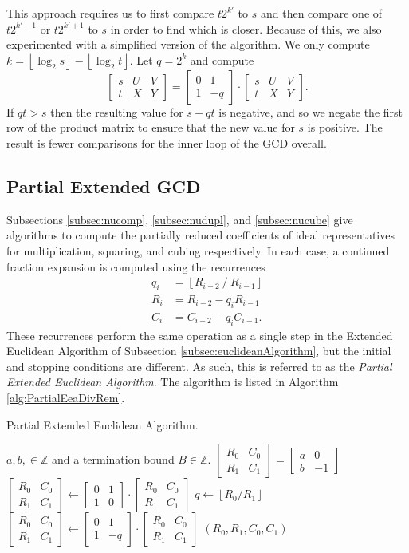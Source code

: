 \documentclass{ucalgthes1}
\theoremstyle{definition}
\newcommand{\ZZ}{\mathbb{Z}}
\newcommand{\matrixtt}[4]{\left[ \begin{array}{rr} #1 & #2 \\ #3 & #4 \end{array} \right]}
\newcommand{\matrixThreeTwo}[6]{\left[ \begin{array}{rrr} #1 & #2 & #3 \\ #4 & #5 & #6 \end{array} \right]}
\newcommand{\floor}[1]{\left\lfloor #1 \right\rfloor}
\begin{document}
This approach requires us to first compare $t2^{k'}$ to $s$ and then compare one of $t2^{k'-1}$ or $t2^{k'+1}$ to $s$ in order to find which is closer.  Because of this, we also experimented with a simplified version of the algorithm.  We only compute $k = \floor{\log_2s}-\floor{\log_2t}$.  Let $q=2^k$ and compute
\[
	\matrixThreeTwo{s}{U}{V}{t}{X}{Y} =
		\matrixtt{0}{1}{1}{-q} \cdot \matrixThreeTwo{s}{U}{V}{t}{X}{Y}.
\]
If $qt > s$ then the resulting value for $s-qt$ is negative, and so we negate the first row of the product matrix to ensure that the new value for $s$ is positive.  The result is fewer comparisons for the inner loop of the GCD overall.



\subsection{Partial Extended GCD}

Subsections \ref{subsec:nucomp}, \ref{subsec:nudupl}, and \ref{subsec:nucube} give algorithms to compute the partially reduced coefficients of ideal representatives for multiplication, squaring, and cubing respectively.  In each case, a continued fraction expansion is computed using the recurrences
\begin{align*}
	q_i &= \floor{R_{i-2} ~/~ R_{i-1}} \\
	R_i &= R_{i-2} - q_i R_{i-1} \\
	C_i &= C_{i-2} - q_i C_{i-1}.
\end{align*}
These recurrences perform the same operation as a single step in the Extended Euclidean Algorithm of Subsection \ref{subsec:euclideanAlgorithm}, but the initial and stopping conditions are different.  As such, this is referred to as the \emph{Partial Extended Euclidean Algorithm}.  The algorithm is listed in Algorithm \ref{alg:PartialEeaDivRem}.

\begin{algorithm}[h]
\caption{Partial Extended Euclidean Algorithm.}
\label{alg:PartialEeaDivRem}
\begin{algorithmic}[1]
\REQUIRE $a,b, \in \ZZ$ and a termination bound $B \in \ZZ$.
\STATE $\matrixtt{R_0}{C_0}{R_1}{C_1} = \matrixtt{a}{0}{b}{-1}$
	\STATE $\matrixtt{R_0}{C_0}{R_1}{C_1} \gets
	        \matrixtt{0}{1}{1}{0} \cdot \matrixtt{R_0}{C_0}{R_1}{C_1}$
\ENDIF
{}
	\STATE $q \gets \floor{R_0 / R_1}$
	\STATE $\matrixtt{R_0}{C_0}{R_1}{C_1} \gets \matrixtt{0}{1}{1}{-q} \cdot
		    \matrixtt{R_0}{C_0}{R_1}{C_1}$ 
\ENDWHILE
\RETURN $(R_0, R_1, C_0, C_1)$
\end{algorithmic}
\end{algorithm}
\end{document}
